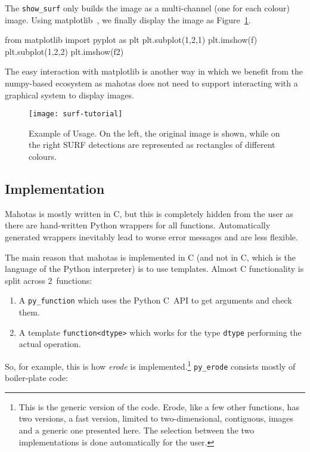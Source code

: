\documentclass{scrartcl}
\newcommand*{\cpp}{{C\nolinebreak[4]\hspace{-.05em}\raisebox{.4ex}{\tiny\textbf{++}}}}
\let\code\texttt
\begin{document}
The \texttt{show\_surf} only builds the image as a multi-channel (one for each
colour) image. Using matplotlib~\citep{10.1109/MCSE.2007.55}, we finally
display the image as Figure~\ref{fig:surf}.

\begin{python}
from matplotlib import pyplot as plt
plt.subplot(1,2,1)
plt.imshow(f)
plt.subplot(1,2,2)
plt.imshow(f2)
\end{python}

The easy interaction with matplotlib is another way in which we benefit from
the numpy-based ecosystem as mahotas does not need to support interacting with
a graphical system to display images.

\begin{figure}
\begin{center}
\texttt{[image: surf-tutorial]}
\end{center}
\caption{Example of Usage. On the left, the original image is shown, while on
the right SURF detections are represented as rectangles of different colours.}
\label{fig:surf}
\end{figure}

\subsection{Implementation}

Mahotas is mostly written in \cpp, but this is completely hidden from the user
as there are hand-written Python wrappers for all functions. Automatically
generated wrappers inevitably lead to worse error messages and are less
flexible.

The main reason that mahotas is implemented in \cpp{} (and not in C, which is
the language of the Python interpreter) is to use templates. Almost \cpp{}
functionality is split across 2~functions:

\begin{enumerate}
\item A \code{py\_function} which uses the Python C~API to get arguments and
check them.
\item A template \code{function<dtype>} which works for the type \code{dtype}
performing the actual operation.
\end{enumerate}

So, for example, this is how \emph{erode} is implemented.\footnote{This is the
generic version of the code. Erode, like a few other functions, has two
versions, a fast version, limited to two-dimensional, contiguous, images and a
generic one presented here. The selection between the two implementations is
done automatically for the user.} \code{py\_erode} consists mostly of
boiler-plate code:
\end{document}
